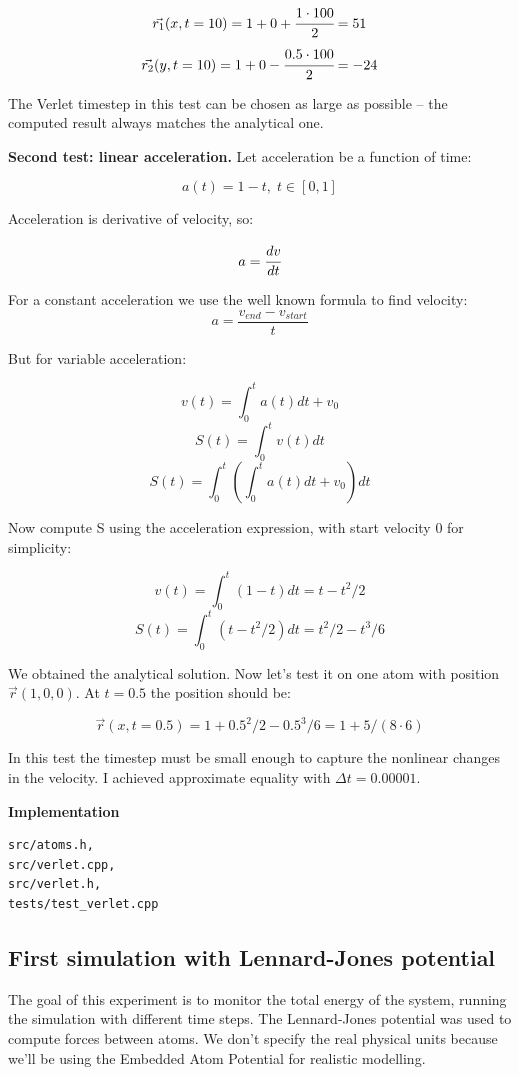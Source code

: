 \documentclass[12pt,a4paper]{article}
\newcommand{\mat}[1]{\vec{#1}}
\begin{document}
\[ \mat{r_1}(x, t=10) = 1 + 0 + \cfrac{1 \cdot 100}{2} = 51 \]
\[ \mat{r_2}(y, t=10) = 1 + 0 - \cfrac{0.5 \cdot 100}{2} = -24 \]

The Verlet timestep in this test can be chosen as large as possible -- the computed result always matches the analytical one.

{\bf Second test: linear acceleration.} Let acceleration be a function of time:

\[ a(t) = 1 - t,\; t \in [0, 1] \]

Acceleration is derivative of velocity, so:

\[ a = \cfrac{dv}{dt} \]

For a constant acceleration we use the well known formula to find velocity: \[ a = \frac{v_{end}-v_{start}}{t} \]

But for variable acceleration:

\[ v(t) = \int_0^t a(t) dt + v_0 \]
\[ S(t) = \int_0^t v(t) dt \]
\[ S(t) = \int_0^t \left( \int_0^t a(t) dt + v_0 \right) dt\]

Now compute S using the acceleration expression, with start velocity 0 for simplicity:

\[ v(t) = \int_0^t (1-t) dt = t - t^2 / 2\]
\[ S(t) = \int_0^t (t - t^2/2) dt = t^2/2 - t^3/6 \]

We obtained the analytical solution. Now let's test it on one atom with position $\mat{r}(1, 0, 0)$. At $t=0.5$ the position should be:

\[ \mat{r}(x, t=0.5) = 1 + 0.5^2/2 - 0.5^3/6 = 1 + 5/(8 \cdot 6)\]

In this test the timestep must be small enough to capture the nonlinear changes in the velocity. I achieved approximate equality with $\Delta t = 0.00001$.

{\bf Implementation}
\begin{lstlisting}[breaklines]
src/atoms.h,
src/verlet.cpp,
src/verlet.h,
tests/test_verlet.cpp
\end{lstlisting}

\clearpage

\subsection*{First simulation with Lennard-Jones potential}

The goal of this experiment is to monitor the total energy of the system, running the simulation with different time steps. The Lennard-Jones potential was used to compute forces between atoms. We don't specify the real physical units because we'll be using the Embedded Atom Potential for realistic modelling.
\end{document}
